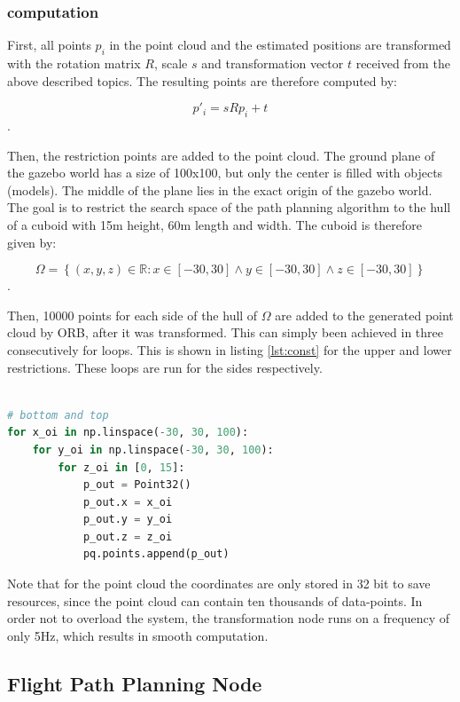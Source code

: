 	\subsubsection{computation}\label{cub}
	
	First, all points $p_i$ in the point cloud and the estimated positions are transformed with the rotation matrix $R$, scale $s$ and transformation vector $t$ received 
	from the above described topics. The resulting points are therefore computed by: 
	
	$$p'_i = sRp_i + t$$.
	
	Then, the restriction points are added to the point cloud.
	The ground plane of the gazebo world has a size of 100x100, but only the center is filled with objects (models). The middle of the plane 
	lies in the exact origin of the gazebo world. The goal is to restrict the search space of the path planning algorithm to the hull of a cuboid with 15m
	height, 60m length and width. The cuboid is therefore given by: 
	
	$$\Omega = \left\{(x, y, z) \in \mathbb{R} : x \in \left[-30, 30\right] \land y \in \left[-30, 30\right] \land z \in \left[-30, 30\right] \right\}$$.
	
	Then, 10000 points for each side of the hull of $\Omega$ are added to the generated point cloud by ORB, after it was transformed. This can simply been achieved 
	in three consecutively for loops. This is shown in listing \ref{lst:const} for the upper and lower restrictions. These loops are run for the sides respectively. 
	
	\begin{lstlisting}[language=python, caption= Adding upper and lower restrictions to point cloud. , label=lst:const]
	
# bottom and top 
for x_oi in np.linspace(-30, 30, 100): 
	for y_oi in np.linspace(-30, 30, 100): 
		for z_oi in [0, 15]: 
			p_out = Point32()
			p_out.x = x_oi
			p_out.y = y_oi
			p_out.z = z_oi
			pq.points.append(p_out)

	\end{lstlisting}

	Note that for the point cloud the coordinates are only stored in 32 bit to save resources, since the point cloud can contain ten thousands of data-points. In order not 
	to overload the system, the transformation node runs on a frequency of only 5Hz, which results in smooth computation. 
	
	\subsection{Flight Path Planning Node} \label{path}
	
